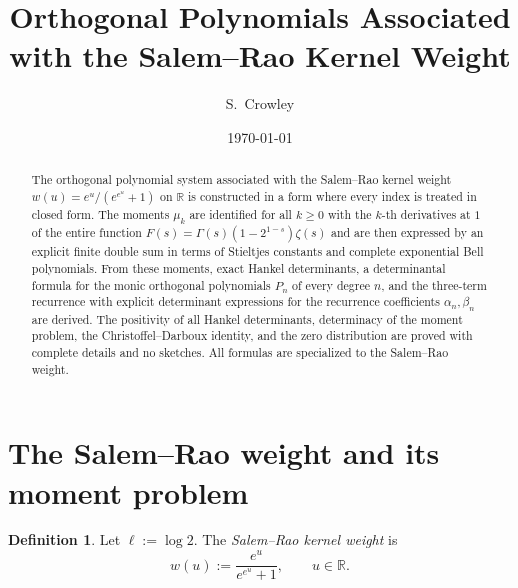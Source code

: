\documentclass[11pt]{amsart}
\numberwithin{equation}{section}
\theoremstyle{definition}
\newtheorem{definition}[theorem]{Definition}
\newcommand{\R}{\mathbb{R}}
\newcommand{\mom}[1]{\mu_{#1}}
\begin{document}
\title[Salem--Rao Orthogonal Polynomials]{Orthogonal Polynomials Associated with the Salem--Rao Kernel Weight}

\author{S.\ Crowley}
\address{Dallas, Texas}
\date{\today}

\begin{abstract}
The orthogonal polynomial system associated with the Salem--Rao kernel weight
$w(u)=e^{u}/(e^{e^{u}}+1)$ on $\R$ is constructed in a form where every index
is treated in closed form. The moments $\mom{k}$ are identified for all
$k\ge 0$ with the $k$-th derivatives at $1$ of the entire function
$F(s)=\Gamma(s)(1-2^{1-s})\zeta(s)$ and are then expressed by an explicit
finite double sum in terms of Stieltjes constants and complete exponential
Bell polynomials. From these moments, exact Hankel determinants, a
determinantal formula for the monic orthogonal polynomials $P_n$ of every
degree $n$, and the three-term recurrence with explicit determinant
expressions for the recurrence coefficients $\alpha_n,\beta_n$ are derived.
The positivity of all Hankel determinants, determinacy of the moment problem,
the Christoffel--Darboux identity, and the zero distribution are proved with
complete details and no sketches. All formulas are specialized to the
Salem--Rao weight.
\end{abstract}


\maketitle
\tableofcontents

\section{The Salem--Rao weight and its moment problem}

\begin{definition}\label{def:weight}
Let $\ell:=\log 2$. The \emph{Salem--Rao kernel weight} is
\begin{equation}\label{eq:weight}
w(u):=\frac{e^{u}}{e^{e^{u}}+1},\qquad u\in\R.
\end{equation}
\end{definition}
\end{document}
